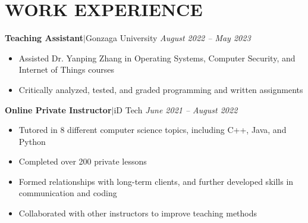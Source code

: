 \documentclass[11pt, a4paper, roman]{moderncv}
\newcommand{\entry}[4]{
	\textbf{#2}\:$|$\:#1 
	\hfill\textit{#3}
	#4
	\vspace{2mm}
}
\begin{document}
\vspace*{-2mm}
\section{WORK EXPERIENCE}

\entry{Gonzaga University}{Teaching Assistant}{August 2022 -- May 2023}
{\begin{itemize}
	\item Assisted Dr. Yanping Zhang in Operating Systems, Computer Security, and Internet of Things courses
	\item Critically analyzed, tested, and graded programming and written assignments
\end{itemize}
}

\entry{iD Tech}{Online Private Instructor}{June 2021 -- August 2022}
{\begin{itemize}
    \item Tutored in 8 different computer science topics, including C++, Java, and Python
    \item Completed over 200 private lessons
    \item Formed relationships with long-term clients, and further developed skills in communication and coding
    \item Collaborated with other instructors to improve teaching methods
  \end{itemize}
}


\end{document}
